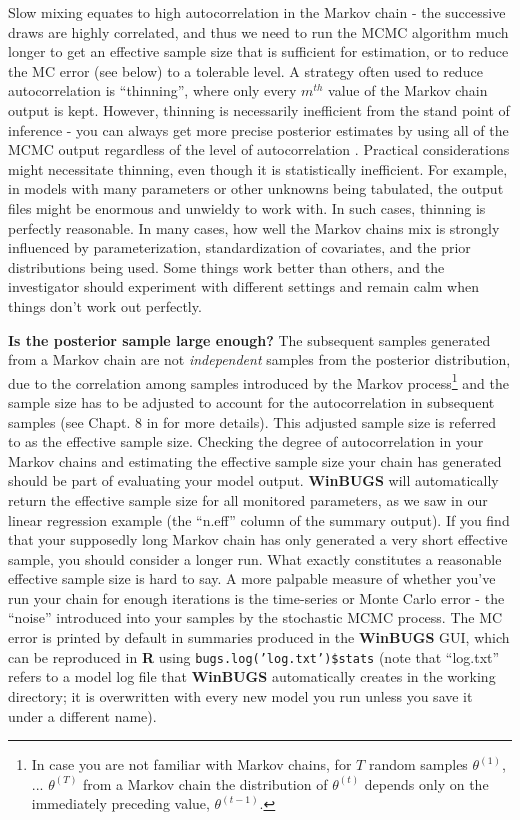 Slow mixing equates to high autocorrelation in the Markov chain - the
successive draws are highly correlated, and thus we need to run the
MCMC algorithm much longer to get an effective sample size that is
sufficient for estimation, or to reduce the MC error (see below) to a
tolerable level.  A strategy often used to reduce autocorrelation is
``thinning'', where only every $m^{th}$ value of the Markov
chain output is kept. However, thinning is necessarily inefficient from the
stand point of inference - you can always get more precise posterior
estimates by using all of the MCMC output regardless of the level of
autocorrelation \citep{maceachern_berliner:1994,
  link_eaton:2011}. Practical considerations might necessitate
thinning, even though it is statistically inefficient. For example, in
models with many parameters or other unknowns being tabulated, the
output files might be enormous and unwieldy to work with. In such
cases, thinning is perfectly reasonable. In many cases, how well the
Markov chains mix is strongly influenced by parameterization,
standardization of covariates, and the prior distributions being
used. Some things work better than others, and the investigator should
experiment with different settings and remain calm when things don't
work out perfectly.


{\bf Is the posterior sample large enough?}  The subsequent samples
generated from a Markov chain are not {\it independent} samples from the
posterior distribution, due to the correlation among samples
introduced by the Markov process\footnote{In case you are not familiar
  with Markov chains, for $T$ random samples $\theta^ {(1)}$,
  ... $\theta^{(T)}$ from a Markov chain the distribution of
  $\theta^{(t)}$ depends only on the immediately preceding value,
  $\theta^{(t-1)}$.} and the sample size has to be adjusted to account
for the autocorrelation in subsequent samples (see Chapt. 8 in
\citet{robert_casella:2010} for more details). This adjusted sample
size is referred to as the effective sample size. Checking the degree
of autocorrelation in your Markov chains and estimating the effective
sample size your chain has generated should be part of evaluating your
model output. {\bf WinBUGS} will automatically return the effective
sample size for all monitored parameters, as we saw in our linear regression example (the ``n.eff'' column of the summary output). If you find that your
supposedly long Markov chain has only generated a very short effective
sample, you should consider a longer run. What exactly constitutes a
reasonable effective sample size is hard to say. A more palpable
measure of whether you've run your chain for enough iterations is the
time-series or Monte Carlo error - the ``noise'' introduced into your
samples by the stochastic MCMC process. The MC error is printed by default in summaries produced in the {\bf
  WinBUGS} GUI, which can be reproduced in {\bf R} using {\tt bugs.log('log.txt')\$stats} (note that ``log.txt'' refers to a model log file that {\bf
  WinBUGS} automatically creates in the working directory; it is overwritten with every new model you run unless you save it under a different name).
 
